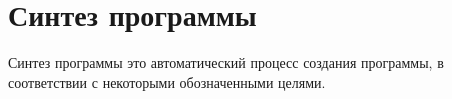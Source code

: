 \section{Синтез программы}

Синтез программы это автоматический процесс создания программы, в соответствии с некоторыми обозначенными целями.



%
%

